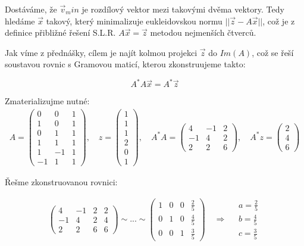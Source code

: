 \documentclass[12pt]{article}
\begin{document}
Dostáváme, že $\vec{v}_min$ je rozdílový vektor mezi takovými dvěma vektory.
Tedy hledáme $\vec{x}$ takový, který minimalizuje eukleidovskou normu $||\vec{z} - A\vec{x}||$,
což je z definice přibližné řešení S.L.R. $A\vec{x}=\vec{z}$ metodou nejmenších čtverců.

Jak víme z přednášky, cílem je najít kolmou projekci $\vec{z}$ do $Im(A)$, což se řeší
soustavou rovnic s Gramovou maticí, kterou zkonstruujeme takto:

\[
  A^*A\vec{x} = A^*\vec{z}
\]

Zmaterializujme nutné:
\begin{align*}
  A = \left(\begin{array}{ccc}
    0 & 0 & 1 \\
    1 & 0 & 1 \\
    0 & 1 & 1 \\
    1 & 1 & 1 \\
    1 & -1 & 1 \\
    -1 & 1 & 1
  \end{array}\right), \quad z = \left(\begin{array}{c}
    1\\1\\1\\2\\0\\1
  \end{array}\right),\quad A^*A = \left(\begin{array}{ccc}
    4 & -1 & 2 \\
    -1 & 4 & 2 \\
    2 & 2 & 6
  \end{array}\right), \quad A^*z = \left(\begin{array}{c}
    2 \\ 4 \\ 6
  \end{array}\right)
\end{align*}

Řešme zkonstruovanou rovnici:

\begin{align*}
  \left(\begin{array}{ccc|c}
    4 & -1 & 2 & 2\\
    -1 & 4 & 2 & 4\\
    2 & 2 & 6 & 6
  \end{array}\right) \sim ... \sim \left(\begin{array}{ccc|c}
    1&0&0&\frac{2}{5} \\[.5em]
    0&1&0&\frac{4}{5} \\[.5em]
    0&0&1&\frac{3}{5}
  \end{array}\right)
  \quad \Longrightarrow \quad \begin{array}{c}
    a=\frac{2}{5} \\[.5em]
    b=\frac{4}{5} \\[.5em]
    c=\frac{3}{5}
  \end{array}
\end{align*}
\end{document}
